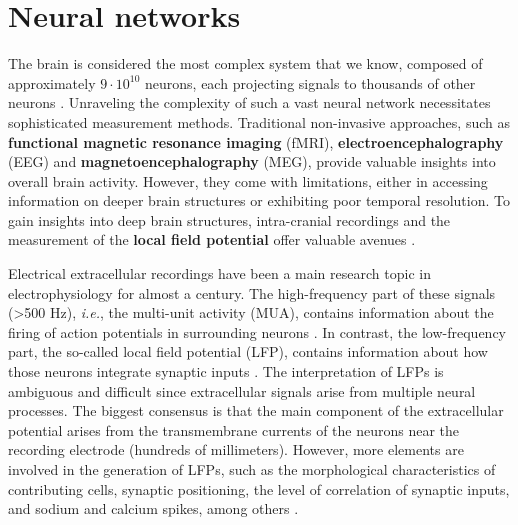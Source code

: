 \documentclass[../main.tex]{subfiles}
\begin{document}
\section{Neural networks}
The brain is considered the most complex system that we know, composed of approximately $9\cdot10^{10}$ neurons, each projecting signals to thousands of other neurons \citep{Vreeken2003SpikingNN,https://doi.org/10.1002/cne.21974}.
Unraveling the complexity of such a vast neural network necessitates sophisticated measurement methods.
Traditional non-invasive approaches, such as \textbf{functional magnetic resonance imaging} (fMRI), \textbf{electroencephalography} (EEG) and \textbf{magnetoencephalography} (MEG), provide valuable insights into overall brain activity.
However, they come with limitations, either in accessing information on deeper brain structures or exhibiting poor temporal resolution.
To gain insights into deep brain structures, intra-cranial recordings and the measurement of the \textbf{local field potential} offer valuable avenues \citep{buzsaki2012origin}.
 
Electrical extracellular recordings have been a main research topic in electrophysiology for almost a century.
The high-frequency part of these signals (>500 Hz), \textit{i.e.}, the multi-unit
activity (MUA), contains information about the firing of action potentials in surrounding neurons \citep{buzsaki_large-scale_2004}. 
In contrast, the low-frequency part, the so-called local field potential (LFP), contains information about how those neurons integrate synaptic inputs \citep{leski_frequency_2013}.
The interpretation of LFPs is ambiguous and difficult since extracellular signals arise from multiple neural processes.
The biggest consensus is that the main component of the extracellular potential arises from the transmembrane currents of the neurons near the recording electrode (hundreds of millimeters). 
However, more elements are involved in the generation of LFPs, such as the morphological characteristics of contributing cells, synaptic positioning, the level of correlation of synaptic inputs, and sodium and calcium spikes, among others \citep{buzsaki_origin_2012}.
\end{document}

